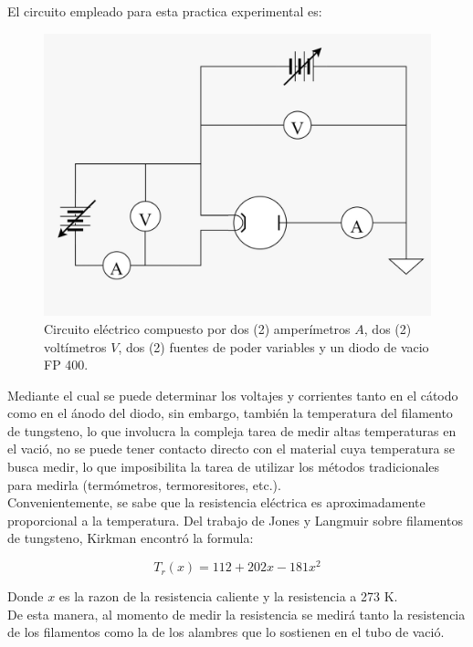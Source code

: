 \documentclass[%
 reprint,
 amsmath,amssymb,
 aps,
]{revtex4-2}
\begin{document}
El circuito empleado para esta practica experimental es:
\\

\begin{figure}[H]
    \centering
    \includegraphics[width=0.8\linewidth]{../src/imagenes/circuito.jpeg}
    \caption{Circuito eléctrico compuesto por dos (2) amperímetros $A$, dos (2) voltímetros $V$, dos (2) fuentes de poder variables y un diodo de vacio FP 400.}
    \label{fig:6}
\end{figure}

Mediante el cual se puede determinar los voltajes y corrientes tanto en el cátodo como en el ánodo del diodo, sin embargo, también la temperatura del filamento de tungsteno, lo que involucra la compleja tarea de medir altas temperaturas en el vació, no se puede tener contacto directo con el material cuya temperatura se busca medir, lo que imposibilita la tarea de utilizar los métodos tradicionales para medirla (termómetros, termoresitores, etc.).
\\

Convenientemente, se sabe que la resistencia eléctrica es aproximadamente proporcional a la temperatura. Del trabajo de Jones y Langmuir \cite{jones} sobre filamentos de tungsteno, Kirkman encontró la formula:

\begin{equation}
    T_{r}(x) = 112 +202x -181x^2
    \label{eq: Kirkman}
\end{equation}
    
\vspace{0.2 cm}
Donde $x$ es la razon de la resistencia caliente y la resistencia a 273 K.
\\

De esta manera, al momento de medir la resistencia se medirá tanto la resistencia de los filamentos como la de los alambres que lo sostienen en el tubo de vació.
\end{document}
